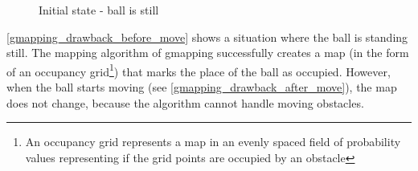 \begin{figure}[!ht]
    \centering
    \caption{Initial state - ball is still}
    \label{gmapping_drawback_before_move}
\end{figure}

\autoref{gmapping_drawback_before_move} shows a situation where the ball is standing still. The mapping algorithm of gmapping successfully creates a map (in the form of an occupancy grid\footnote{An occupancy grid represents a map in an evenly spaced field of probability values representing if the grid points are occupied by an obstacle}) that marks the place of the ball as occupied. However, when the ball starts moving (see \autoref{gmapping_drawback_after_move}), the map does not change, because the algorithm cannot handle moving obstacles.

